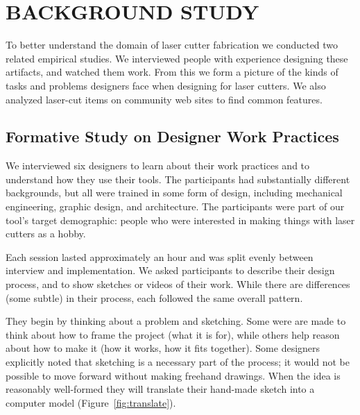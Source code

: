 \documentclass{article}
\begin{document}
\section{BACKGROUND STUDY}

To better understand the domain of laser cutter fabrication we
conducted two related empirical studies. We interviewed people with
experience designing these artifacts, and watched them work. From this
we form a picture of the kinds of tasks and problems designers face
when designing for laser cutters. We also analyzed laser-cut items on
community web sites to find common features.

\subsection{Formative Study on Designer Work Practices}
\label{sec:formative}

We interviewed six designers to learn about their work practices and
to understand how they use their tools. The participants had
substantially different backgrounds, but all were trained in some form
of design, including mechanical engineering, graphic design, and
architecture. The participants were part of our tool's target
demographic: people who were interested in making things with laser
cutters as a hobby.

Each session lasted approximately an hour and was split evenly between
interview and implementation. We asked participants to describe their
design process, and to show sketches or videos of their work. While
there are differences (some subtle) in their process, each followed
the same overall pattern.

They begin by thinking about a problem and sketching. Some were are
made to think about how to frame the project (what it is for), while
others help reason about how to make it (how it works, how it fits
together). Some designers explicitly noted that sketching is a
necessary part of the process; it would not be possible to move
forward without making freehand drawings. When the idea is reasonably
well-formed they will translate their hand-made sketch into a computer
model (Figure~\ref{fig:translate}).
\end{document}
